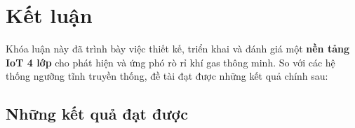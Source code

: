 
\section{Kết luận}

Khóa luận này đã trình bày việc thiết kế, triển khai và đánh giá một \textbf{nền tảng IoT 4 lớp} cho phát hiện và ứng phó rò rỉ khí gas thông minh. So với các hệ thống ngưỡng tĩnh truyền thống, đề tài đạt được những kết quả chính sau:

\subsection{Những kết quả đạt được}

